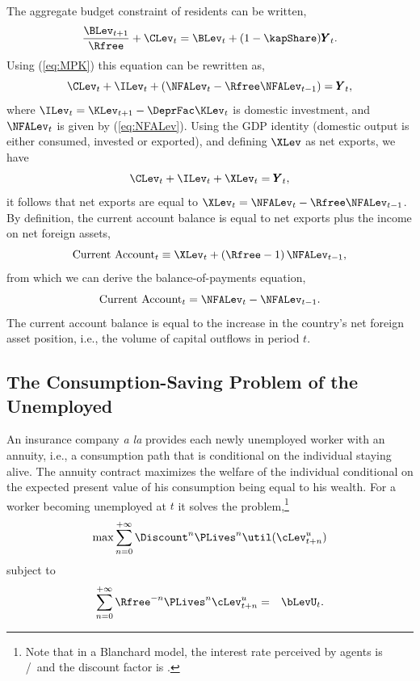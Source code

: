 \documentclass[titlepage]{\econtex}\newcommand{\texname}{cjSOE}
\renewcommand{\GDPLev}{\ensuremath{\pmb{Y}}}
\begin{document}
The aggregate budget constraint of residents can be written,
\begin{equation*}
\frac{\BLev_{t+1}}{\Rfree}+\CLev_t=\BLev_t+(1-\kapShare)\GDPLev_t.
\end{equation*}
Using (\ref{eq:MPK}) this equation can be rewritten as,
\begin{equation*}
\CLev_t+\ILev_t+\left(\NFALev_t-\Rfree \NFALev_{t-1} \right)=\GDPLev_t,
\end{equation*}
where $\ILev_t=\KLev_{t+1}- \DeprFac \KLev_t$ is domestic investment, and $\NFALev_t$ is given by (\ref{eq:NFALev}). Using the GDP identity (domestic output is either consumed, invested or exported),
and defining $\XLev$ as net exports, we have
\begin{equation*}
\CLev_t+\ILev_t+\XLev_t=\GDPLev_t,
\end{equation*}
it follows that net exports are equal to $\XLev_t=\NFALev_t-\Rfree \NFALev_{t-1}$. By definition, the current account balance is equal to net exports plus the income on net foreign assets,
\begin{equation*}
\text{Current Account}_t \equiv \XLev_t+\left(\Rfree-1 \right) \NFALev_{t-1},
\end{equation*}
from which we can derive the balance-of-payments equation,
\begin{equation*}
\text{Current Account}_t=\NFALev_t -\NFALev_{t-1}.
\end{equation*}
The current account balance is equal to the increase in the country's net foreign asset position, i.e., the volume of capital outflows in period $t$.

\subsection{The Consumption-Saving Problem of the Unemployed}

An insurance company {\it a la} \cite{blanchardFinite} provides each
newly unemployed worker with an annuity, i.e., a consumption path that
is conditional on the individual staying alive. The annuity contract
maximizes the welfare of the individual conditional on the expected
present value of his consumption being equal to his wealth. For a
worker becoming unemployed at $t$ it solves the problem,\footnote{Note that in a Blanchard model, the interest rate perceived by agents is \Rfree/\PLives~and the discount factor is \Discount \PLives.}
\begin{equation*}
 \max \sum_{n=0}^{+ \infty} \Discount^{n} \PLives^{n} \util(\cLev^u_{t+n})
\end{equation*}
subject to
\begin{eqnarray*}
\sum_{n=0}^{+ \infty} \Rfree^{-n} \PLives^{n} \cLev^u_{t+n} & = &\bLevU_t.
\end{eqnarray*}
\end{document}
